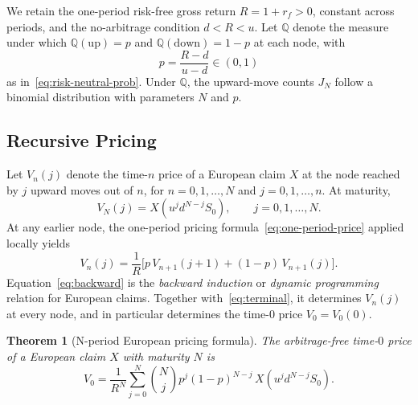 \documentclass[11pt,a4paper]{article}
\theoremstyle{plain}
\newtheorem{theorem}{Theorem}[section]
\theoremstyle{definition}
\newcommand{\Q}{\mathbb{Q}}
\begin{document}
We retain the one-period risk-free gross return $R = 1 + r_f > 0$,
constant across periods, and the no-arbitrage condition
$d < R < u$. Let $\Q$ denote the measure under which $\Q(\text{up}) = p$
and $\Q(\text{down}) = 1-p$ at each node, with
\[
p = \frac{R - d}{u - d} \in (0,1)
\]
as in~\eqref{eq:risk-neutral-prob}. Under $\Q$, the upward-move counts
$J_N$ follow a binomial distribution with parameters $N$ and $p$.

\subsection{Recursive Pricing}
\label{subsec:recursive}

Let $V_n(j)$ denote the time-$n$ price of a European claim $X$ at the node
reached by $j$ upward moves out of $n$, for $n = 0, 1, \dots, N$ and
$j = 0, 1, \dots, n$. At maturity,
\begin{equation}
    \label{eq:terminal}
    V_N(j) = X(u^j d^{N-j} S_0), \qquad j = 0, 1, \dots, N.
\end{equation}
At any earlier node, the one-period pricing
formula~\eqref{eq:one-period-price} applied locally yields
\begin{equation}
    \label{eq:backward}
    V_n(j) = \frac{1}{R}\bigl[ p\, V_{n+1}(j+1) + (1-p)\, V_{n+1}(j) \bigr].
\end{equation}
Equation~\eqref{eq:backward} is the \emph{backward induction} or
\emph{dynamic programming} relation for European claims. Together
with~\eqref{eq:terminal}, it determines $V_n(j)$ at every node, and in
particular determines the time-$0$ price $V_0 = V_0(0)$.

\begin{theorem}[N-period European pricing formula]
\label{thm:n-period-pricing}
The arbitrage-free time-$0$ price of a European claim $X$ with maturity
$N$ is
\begin{equation}
    \label{eq:n-period-price}
    V_0 = \frac{1}{R^N} \sum_{j=0}^{N} \binom{N}{j} p^j (1-p)^{N-j}\,
          X(u^j d^{N-j} S_0).
\end{equation}
\end{theorem}
\end{document}
